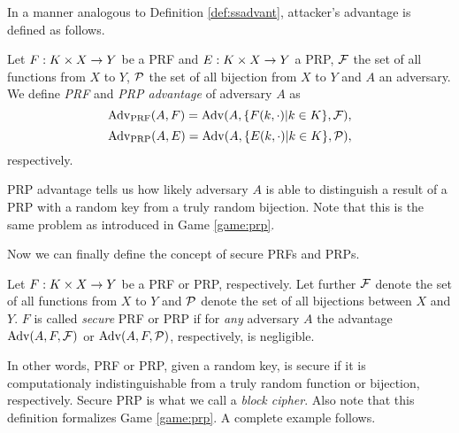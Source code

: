 In a manner analogous to Definition \ref{def:ssadvant}, attacker's advantage is defined as follows.

\begin{defn}
\label{def:prfadvant}\label{def:prpadvant}
	Let $F: K\times X\rightarrow Y$ be a PRF and $E: K\times X\rightarrow Y$ a PRP, $\cal F$ the set of all functions from $X$ to $Y$, $\cal P$ the set of all bijection from $X$ to $Y$ and $A$ an adversary. We define {\em PRF} and {\em PRP advantage} of adversary $A$ as
	\[
		\operatorname*{Adv_{PRF}}(A,F) = \operatorname*{Adv}(A,\{F(k,\cdot)|k\in K\},{\cal F}) ,
	\]
	\[
		\operatorname*{Adv_{PRP}}(A,E) = \operatorname*{Adv}(A,\{E(k,\cdot)|k\in K\},{\cal P}) ,
	\]
	respectively.
\end{defn}

PRP advantage tells us how likely adversary $A$ is able to distinguish a result of a PRP with a random key from a truly random bijection. Note that this is the same problem as introduced in Game \ref{game:prp}.   %

Now we can finally define the concept of secure PRFs and PRPs.

\begin{defn}
\label{def:secprf}\label{def:secprp}
	Let $F: K\times X\rightarrow Y$ be a PRF or PRP, respectively. Let further $\cal F$ denote the set of all functions from $X$ to $Y$ and $\cal P$ denote the set of all bijections between $X$ and $Y$. $F$ is called {\em secure} PRF or PRP if for {\em any} adversary $A$ the advantage $\operatorname*{Adv}(A,F,{\cal F})$ or $\operatorname*{Adv}(A,F,{\cal P})$, respectively, is negligible.   %
\end{defn}

In other words, PRF or PRP, given a random key, is secure if it is computationaly indistinguishable from a truly random function or bijection, respectively. Secure PRP is what we call a {\em block cipher}. Also note that this definition formalizes Game \ref{game:prp}. A complete example follows.

